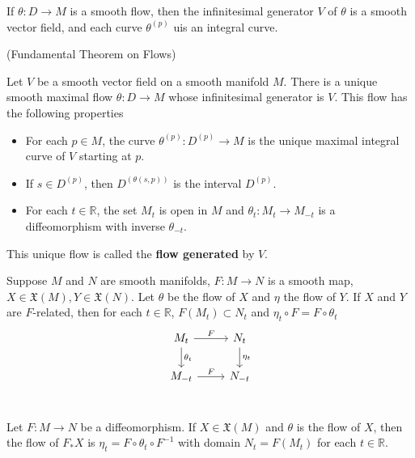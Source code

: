 \begin{proposition}
    If $\theta:D\to M$ is a smooth flow, then the infinitesimal generator $V$ of $\theta$ is a smooth vector field, and each curve $\theta^{(p)}$ uis an integral curve.
\end{proposition}

\begin{theorem}(Fundamental Theorem on Flows)\par
    Let $V$ be a smooth vector field on a smooth manifold $M$. There is a unique smooth maximal flow $\theta:D\to M$ whose infinitesimal generator is $V$. This flow has the following properties
    \begin{itemize}
        \item For each $p\in M$, the curve $\theta^{(p)}:D^{(p)}\to M$ is the unique maximal integral curve of $V$ starting at $p$.
        \item If $s\in D^{(p)}$, then $D^{(\theta(s,p))}$ is the interval $D^{(p)}$.
        \item For each $t\in \mathbb{R}$, the set $M_t$ is open in $M$ and $\theta_t:M_t \to M_{-t}$ is a diffeomorphism with inverse $\theta_{-t}$.
    \end{itemize}
    This unique flow is called the \textbf{flow generated} by $V$.
\end{theorem}

\begin{proposition}
    Suppose $M$ and $N$ are smooth manifolds, $F:M\to N$ is a smooth map, $X\in\mathfrak{X}(M), Y \in \mathfrak{X}(N)$. Let $\theta$ be the flow of $X$ and $\eta$ the flow of $Y$. If $X$ and $Y$ are $F$-related, then for each $t\in\mathbb{R}$, $F(M_t) \subset N_t$ and $\eta_t\circ F = F\circ \theta_t$
    \[
    \begin{tikzcd}
        M_t\arrow[r,"F"]\arrow[d,"\theta_t"] &  N_t\arrow[d,"\eta_t"]\\
        M_{-t}\arrow[r,"F"] & N_{-t}\\
    \end{tikzcd}
    \]
\end{proposition}

\begin{corollary}
    Let $F:M\to N$ be a diffeomorphism. If $X\in\mathfrak{X}(M)$ and $\theta$ is the flow of $X$, then the flow of $F_*X$ is $\eta_t = F\circ \theta_t\circ F^{-1}$ with domain $N_t = F(M_t)$ for each $t\in\mathbb{R}$.
\end{corollary}


